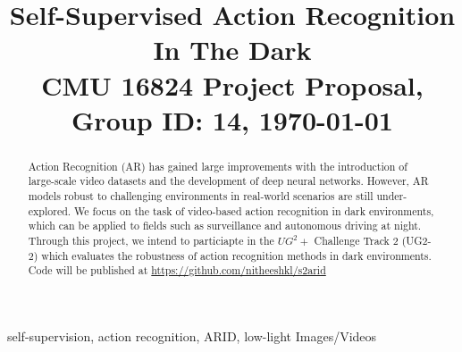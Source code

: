 \documentclass[conference]{IEEEtran}
\begin{document}
\title{Self-Supervised Action Recognition In The Dark\\
{\small CMU 16824 Project Proposal, Group ID: 14, \today }
}

\author{
    \and
    \and
}

\maketitle

\begin{abstract}
Action Recognition (AR) has gained large improvements with the introduction of large-scale video datasets and the development of deep neural networks. However, AR models robust to challenging environments in real-world scenarios are still under-explored. We focus on the task of video-based action recognition in dark environments, which can be applied to fields such as surveillance and autonomous driving at night. Through this project, we intend to particiapte in the $UG^{2}+$ Challenge Track 2 (UG2-2)\cite{UG2-2} which evaluates the robustness of action recognition methods in dark environments. Code will be published at \url{https://github.com/nitheeshkl/s2arid}
\end{abstract}

\vspace{10pt}

\begin{IEEEkeywords}
self-supervision, action recognition, ARID, low-light Images/Videos
\end{IEEEkeywords}
\end{document}
